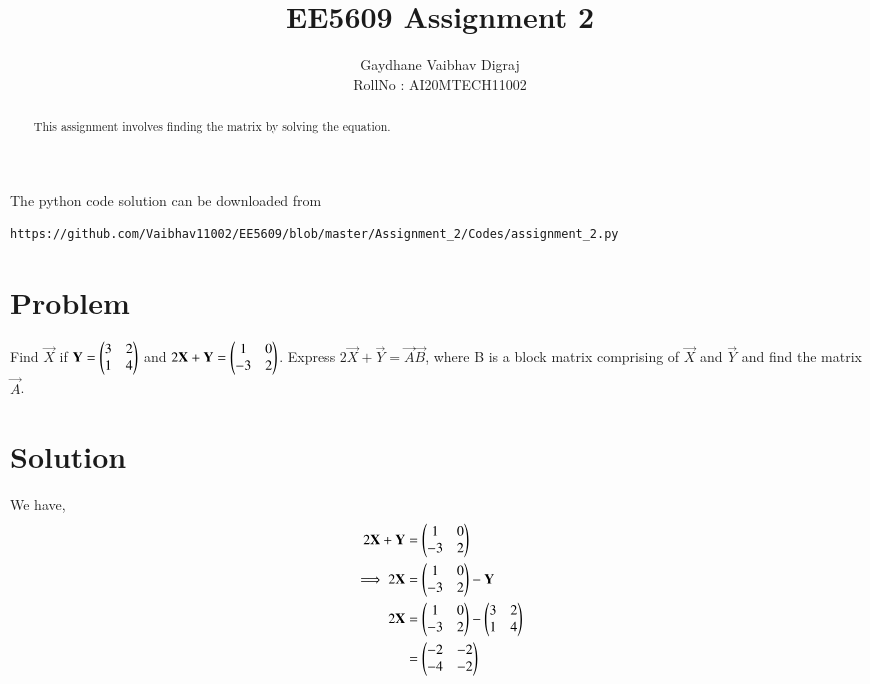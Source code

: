 \documentclass[journal,12pt,twocolumn]{IEEEtran}
\begin{document}
    \def\rightbox#1{\makebox[0in][r]{#1}}
 \def\centbox#1{\makebox[0in]{#1}}
     \def\topbox#1{\raisebox{-\baselineskip}[0in][0in]{#1}}
     \def\midbox#1{\raisebox{-0.5\baselineskip}[0in][0in]{#1}}
\vspace{3cm}
\title{EE5609 Assignment 2}
\author{Gaydhane Vaibhav Digraj \\ RollNo : AI20MTECH11002 }
\maketitle
\newpage
\bigskip
\renewcommand{\thefigure}{\theenumi}
\renewcommand{\thetable}{\theenumi}
\begin{abstract}
This assignment involves finding the matrix  by solving the equation. 
\end{abstract}
The python code solution can be downloaded from
\begin{lstlisting}
https://github.com/Vaibhav11002/EE5609/blob/master/Assignment_2/Codes/assignment_2.py
\end{lstlisting}

\section{Problem}
Find $\vec{X}$ if $\mathbf{Y} = \begin{pmatrix} 3 & 2 \\ 1 & 4 \end{pmatrix}$ and $2\mathbf{X}+\mathbf{Y} = \begin{pmatrix}1 & 0 \\ -3 & 2\end{pmatrix}$. Express $2\vec{X}+\vec{Y} = \vec{A}\vec{B}$, where B is a block matrix comprising of $\vec{X}$ and $\vec{Y}$ and find the matrix $\vec{A}$. 
\vspace{2mm}

\section{Solution}
We have, 
\begin{align}
2\mathbf{X}+\mathbf{Y} &= \begin{pmatrix}1 & 0 \\ -3 & 2 \end{pmatrix} \\
\implies 2\mathbf{X} &= \begin{pmatrix}1 & 0 \\ -3 & 2 \end{pmatrix} - \mathbf{Y} \\
2\mathbf{X} &= \begin{pmatrix}1 & 0 \\ -3 & 2 \end{pmatrix} - \begin{pmatrix}3 & 2 \\ 1 & 4\end{pmatrix} \notag \\
&= \begin{pmatrix}-2 & -2 \\ -4 & -2 \end{pmatrix}
\end{align}
\end{document}

